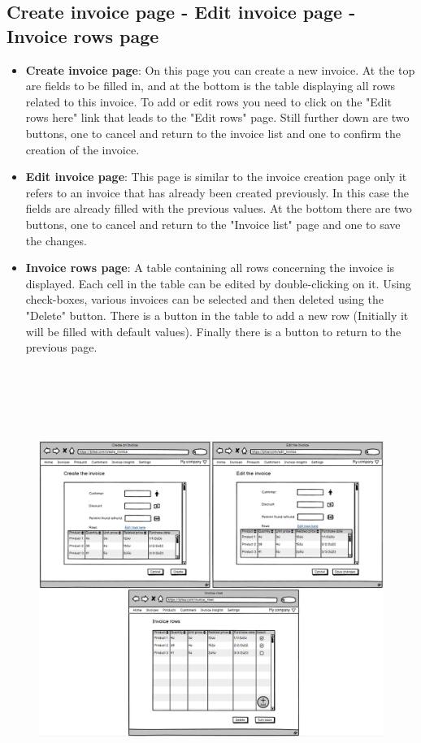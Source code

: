\subsection{Create invoice page - Edit invoice page - Invoice rows page}

\begin{itemize}
    \item \textbf{Create invoice page}: On this page you can create a new invoice. At the top are fields to be filled in, and at the bottom is the table displaying all rows related to this invoice. To add or edit rows you need to click on the "Edit rows here" link that leads to the "Edit rows" page. Still further down are two buttons, one to cancel and return to the invoice list and one to confirm the creation of the invoice.
    \item \textbf{Edit invoice page}: This page is similar to the invoice creation page only it refers to an invoice that has already been created previously. In this case the fields are already filled with the previous values. At the bottom there are two buttons, one to cancel and return to the "Invoice list" page and one to save the changes.
    \item \textbf{Invoice rows page}: A table containing all rows concerning the invoice is displayed. Each cell in the table can be edited by double-clicking on it. Using check-boxes, various invoices can be selected and then deleted using the "Delete" button. There is a button in the table to add a new row (Initially it will be filled with default values). Finally there is a button to return to the previous page.
\end{itemize}

\begin{figure}[h!]
    \centering
    \includegraphics[height=410pt, keepaspectratio]{resources/mockup/Invoice.png}
\end{figure}
\newpage

